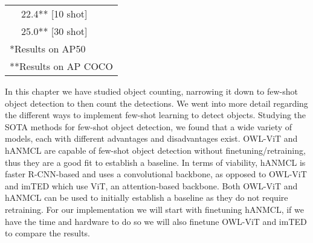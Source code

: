\begin{table}[H]
\begin{tabular}{lll}
	\multicolumn{1}{|l|}{}                         & \multicolumn{1}{l|}{22.4** [10 shot]}           & \multicolumn{1}{l|}{}\\ \cline{2-2}
	\multicolumn{1}{|l|}{}                         & \multicolumn{1}{l|}{25.0** [30 shot]}           & \multicolumn{1}{l|}{}\\ \hline
	\multicolumn{3}{l}{*Results on AP50}\\
	\multicolumn{3}{l}{**Results on AP COCO}
	\end{tabular}
\end{table}
In this chapter we have studied object counting, narrowing it down to few-shot object detection to then count the detections. We went into more detail regarding the different ways to implement few-shot learning to detect objects. Studying the SOTA methods for few-shot object detection, we found that a wide variety of models, each with different advantages and disadvantages exist. OWL-ViT and hANMCL are capable of few-shot object detection without finetuning/retraining, thus they are a good fit to establish a baseline. In terms of viability, hANMCL is faster R-CNN-based and uses a convolutional backbone, as opposed to OWL-ViT and imTED which use ViT, an attention-based backbone. Both OWL-ViT and hANMCL can be used to initially establish a baseline as they do not require retraining. For our implementation we will start with finetuning hANMCL, if we have the time and hardware to do so we will also finetune OWL-ViT and imTED to compare the results.
